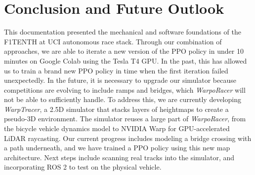 \documentclass[11pt,letterpaper]{article}
\begin{document}
\section{Conclusion and Future Outlook}
This documentation presented the mechanical and software foundations of the F1TENTH at UCI autonomous race stack. Through our combination of approaches, 
we are able to iterate a new version of the PPO policy in under 10 minutes on Google Colab using the Tesla T4 GPU. In the past, this has allowed us to train a brand new PPO policy in time when the first iteration failed unexpectedly.
In the future, it is necessary to upgrade our simulator because competitions are evolving to include ramps and bridges, which \textit{WarpoRacer} 
will not be able to sufficiently handle. To address this, we are currently developing \textit{WarpTracer}, a 2.5D simulator that stacks layers of heightmaps to create a pseudo-3D environment.
The simulator reuses a large part of \textit{WarpoRacer}, from the bicycle vehicle dynamics model to NVIDIA Warp for GPU-accelerated LiDAR raycasting. 
Our current progress includes modeling a bridge crossing with a path underneath, and we have trained a PPO policy using this new map architecture. 
Next steps include scanning real tracks into the simulator, and incorporating ROS 2 to test on the physical vehicle.
\end{document}
